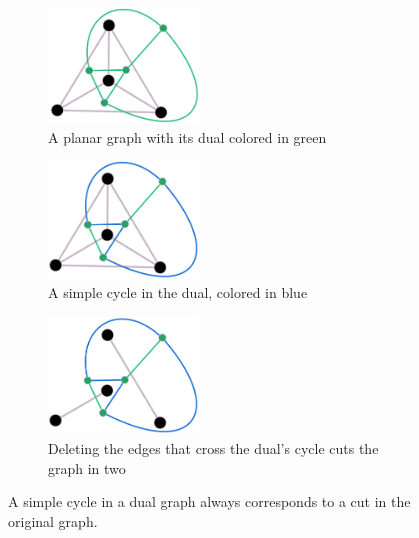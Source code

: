\begin{figure}
    \centering
    \begin{subfigure}{.3\textwidth}
        \centering
        \includegraphics[width=4cm]{figures/duality/k4 with dual.png}
        \caption{A planar graph with its dual colored in green}
        \label{figure:k4-with-dual}
    \end{subfigure}\hfill%
    \begin{subfigure}{.3\textwidth}
        \centering
        \includegraphics[width=4cm]{figures/duality/dual with cycle.png}
        \caption{A simple cycle in the dual, colored in blue}
        \label{figure:dual-with-cycle}
    \end{subfigure}\hfill%
    \begin{subfigure}{.3\textwidth}
        \centering
        \includegraphics[width=4cm]{figures/duality/k4 cut in pieces.png}
        \caption{Deleting the edges that cross the dual's cycle cuts the graph in two}
        \label{figure:k4-cut}
    \end{subfigure}
    \caption{A simple cycle in a dual graph always corresponds to a cut in the original graph.}
    \label{figure:cycle-cut}
\end{figure}
